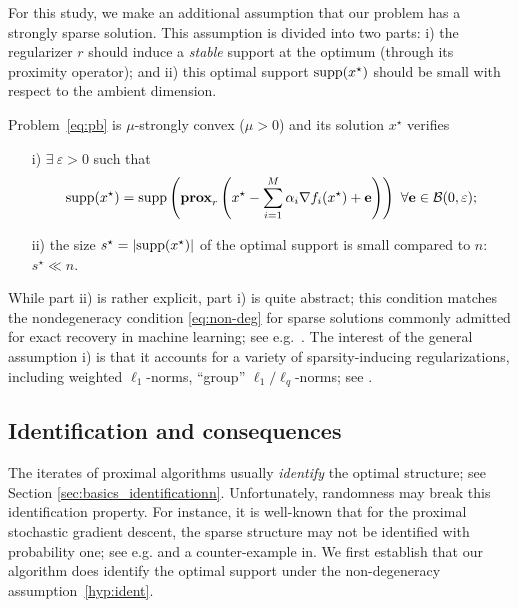 For this study, we make an additional assumption that our problem has a strongly sparse solution. This assumption is divided into two parts: i) the regularizer $r$ should induce a \emph{stable} support at the optimum (through its proximity operator); and ii) this optimal support $\mathrm{supp}(x^\star)$ should be small with respect to the ambient dimension.
\begin{assumption} \label{hyp:ident}
Problem~\eqref{eq:pb} is $\mu$-strongly convex ($\mu>0$) and its solution $x^\star$ verifies
\begin{itemize}
   \item[i)] $\exists~ \varepsilon>0$ such that 
   $$
   \mathrm{supp}(x^\star) = \mathrm{supp} \left( \mathbf{prox}_{r} \left( x^\star - \sum_{i=1}^M  \alpha_i  \nabla f_i(x^\star) + \mathbf{e}   \right)   \right)~ \forall \mathbf{e} \in \mathcal{B}(0,\varepsilon);
   $$
    \item[ii)] the size $s^\star =|\mathrm{supp}(x^\star)|$ of the optimal support is small compared to $n$: $s^\star\ll n$.
\end{itemize}
\end{assumption}
While part ii) is rather explicit, part i) is quite abstract; 
this condition matches the nondegeneracy condition \eqref{eq:non-deg} for sparse solutions commonly admitted for exact recovery in machine learning; see e.g.~\cite{nutini2019active,pmlr-v89-sun19a}.
The interest of the general assumption i) is that it accounts for a variety of sparsity-inducing regularizations, including weighted $\ell_1$-norms, ``group'' $\ell_1/\ell_q$-norms; see \cite[Sec.~3.3]{bach2012optimization}.

\subsection{Identification and consequences} \label{sec:identif2}

The iterates of proximal algorithms usually \emph{identify} the optimal structure; see Section \ref{sec:basics_identificationn}. %
Unfortunately, randomness may break this identification property. For instance, it is well-known that for the proximal stochastic gradient descent, the sparse structure may not be identified with probability one; see e.g.\;\cite{lee2012manifold} and a counter-example in\;\cite{poon2018local}. We first establish that our algorithm does identify the optimal support under the non-degeneracy assumption~\ref{hyp:ident}.

